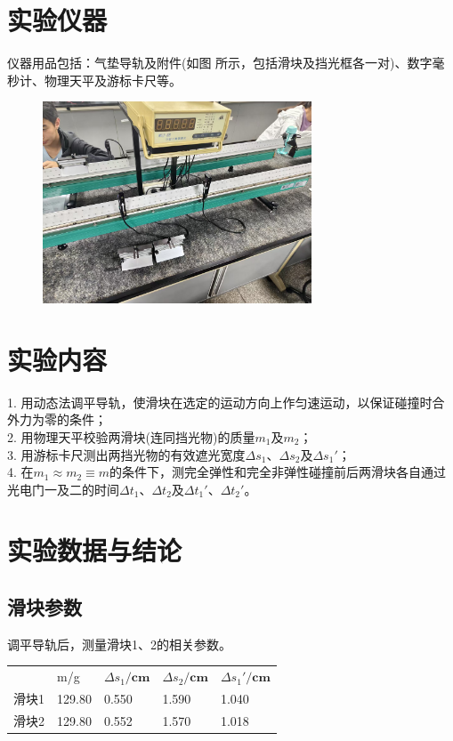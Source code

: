 \documentclass{article}
\begin{document}
\section{实验仪器}
\hspace*{2em}仪器用品包括：气垫导轨及附件(如图 所示，包括滑块及挡光框各一对)、数字毫秒计、物理天平及游标卡尺等。 
\begin{figure}[!h]
    \centering
    \includegraphics[width=8cm]{1.jpg}
\end{figure}
\section{实验内容}
\hspace*{2em}1. 用动态法调平导轨，使滑块在选定的运动方向上作匀速运动，以保证碰撞时合外力为零的条件；\\
\hspace*{2em}2. 用物理天平校验两滑块(连同挡光物)的质量\(m_1\)及\(m_2\)；\\
\hspace*{2em}3. 用游标卡尺测出两挡光物的有效遮光宽度\(\Delta s_1\)、\(\Delta s_2\)及\(\Delta s_1'\)；\\
\hspace*{2em}4. 在\(m_1 \approx m_2 \equiv m\)的条件下，测完全弹性和完全非弹性碰撞前后两滑块各自通过光电门一及二的时间\(\Delta t_1\)、\(\Delta t_2\)及\(\Delta t_1'\)、\(\Delta t_2'\)。
\section{实验数据与结论}
\subsection{滑块参数}
\hspace*{2em}调平导轨后，测量滑块1、2的相关参数。
\begin{table}[ht]
    \centering
    \begin{tabular}{lllll}
    \hline\hline
      & m/g & $\Delta s_1/\mathbf{cm}$ & $\Delta s_2/\mathbf{cm}$ & $\Delta s_1'/\mathbf{cm}$ \\
    滑块1 & 129.80  &  0.550  &  1.590  &  1.040 \\
    滑块2 & 129.80  &  0.552  &  1.570  &  1.018 \\
    \hline\hline  
    \end{tabular}
    \end{table}
\end{document}
